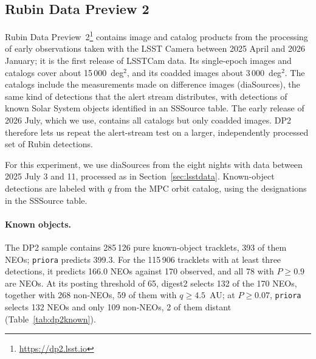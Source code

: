 \documentclass[linenumbers,twocolumn]{aastex701}
\newcommand{\priora}{{\tt priora}\xspace} %
\begin{document}
\subsection{Rubin Data Preview 2}
\label{sec:dp2}

Rubin Data Preview~2\footnote{\url{https://dp2.lsst.io}} \citep[hereafter
DP2;][]{RTN-115,dp2data} contains image and catalog products from the
processing of early
observations taken with the LSST Camera \citep[LSSTCam;][]{lsstcam} between
2025 April and 2026 January; it is the first release of LSSTCam data. Its
single-epoch images and catalogs cover
about 15\,000~deg$^2$, and its coadded images about 3\,000~deg$^2$. The
catalogs include the measurements made on difference images
(diaSources), the same kind of detections that the alert stream
distributes, with detections of known Solar System objects identified in
an SSSource table. The early release of 2026 July, which we use, contains
all catalogs but only coadded images. DP2 therefore lets us repeat the
alert-stream test on a larger, independently processed set of Rubin
detections.
\medskip

For this experiment, we use diaSources from the eight nights with data between 2025 July 3 and
11, processed as in Section~\ref{sec:lsstdata}. Known-object detections are
labeled with $q$ from the MPC orbit catalog, using the designations in
the SSSource table.

\paragraph{Known objects.}
The DP2 sample contains 285\,126 pure known-object tracklets, 393 of them
NEOs; \priora predicts 399.3. For the 115\,906 tracklets with at least three
detections, it predicts 166.0 NEOs against 170 observed, and all 78 with
$P\geq0.9$ are NEOs. At its posting threshold of 65, digest2 selects 132 of
the 170 NEOs, together with 268 non-NEOs, 59 of them with $q\geq4.5$~AU; at
$P\geq0.07$, \priora selects 132 NEOs and only 109 non-NEOs, 2 of them distant
(Table~\ref{tab:dp2known}).
\end{document}
